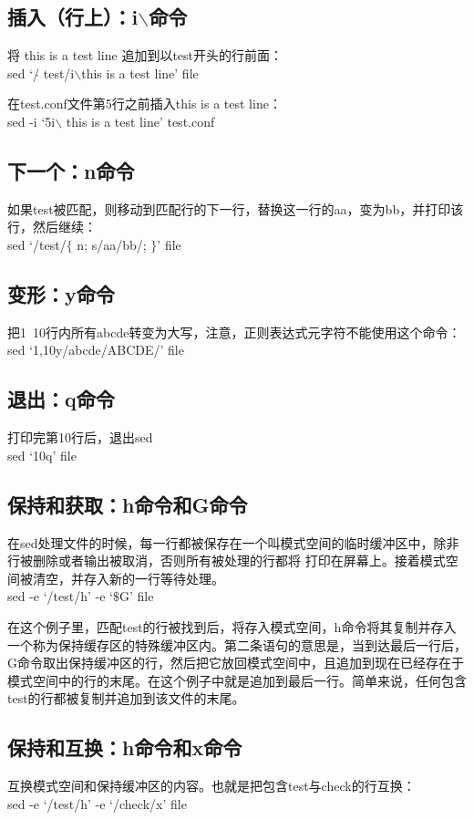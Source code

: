 \documentclass[12pt,a4paper]{article}
\begin{document}
\subsection{插入（行上）：i$\backslash$命令}
将 this is a test line 追加到以test开头的行前面：\\
sed `/$\hat{}$ test/i$\backslash$this is a test line' file 

在test.conf文件第5行之前插入this is a test line： \\
sed -i `5i$\backslash$ this is a test line' test.conf 

\subsection{下一个：n命令}
如果test被匹配，则移动到匹配行的下一行，替换这一行的aa，变为bb，并打印该行，然后继续：\\
sed `/test/$\{$ n; s/aa/bb/; $\}$' file 

\subsection{变形：y命令}
把1~10行内所有abcde转变为大写，注意，正则表达式元字符不能使用这个命令：\\
sed `1,10y/abcde/ABCDE/' file 

\subsection{退出：q命令}
打印完第10行后，退出sed \\
sed `10q' file 

\subsection{保持和获取：h命令和G命令}
在sed处理文件的时候，每一行都被保存在一个叫模式空间的临时缓冲区中，除非行被删除或者输出被取消，否则所有被处理的行都将 打印在屏幕上。接着模式空间被清空，并存入新的一行等待处理。\\
sed -e `/test/h' -e `$\$$G' file 

在这个例子里，匹配test的行被找到后，将存入模式空间，h命令将其复制并存入一个称为保持缓存区的特殊缓冲区内。第二条语句的意思是，当到达最后一行后，G命令取出保持缓冲区的行，然后把它放回模式空间中，且追加到现在已经存在于模式空间中的行的末尾。在这个例子中就是追加到最后一行。简单来说，任何包含test的行都被复制并追加到该文件的末尾。 

\subsection{保持和互换：h命令和x命令}
互换模式空间和保持缓冲区的内容。也就是把包含test与check的行互换：\\
sed -e `/test/h' -e `/check/x' file
\end{document}
